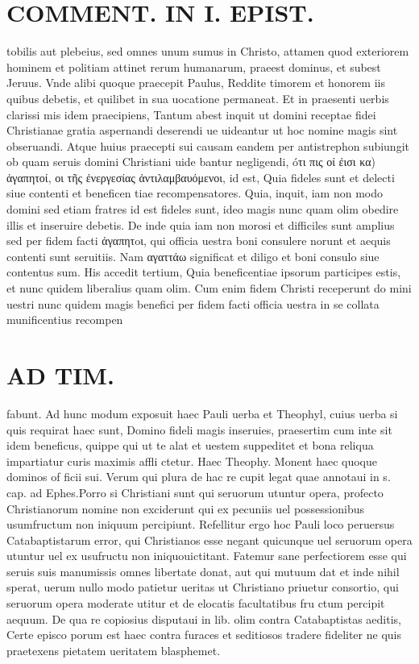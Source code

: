 \documentclass{article}
\begin{document}
\begin{pages}
\section*{COMMENT. IN I. EPIST. }\pstart tobilis aut plebeius, sed omnes unum sumus in Christo, attamen quod exteriorem hominem et politiam attinet rerum humanarum, praeest dominus, et subest Jeruus. Vnde alibi quoque praecepit Paulus, Reddite timorem et honorem iis quibus debetis, et quilibet in sua uocatione permaneat. Et in praesenti uerbis clarissi mis idem praecipiens, Tantum abest inquit ut domini receptae fidei Christianae gratia aspernandi deserendi ue uideantur ut hoc nomine magis sint obseruandi. Atque huius praecepti sui causam eandem per antistrephon subiungit ob quam seruis domini Christiani uide bantur negligendi, óτι πις οί ἐισι κα) ἀγαπητοί, οι τῆς ἐνεργεσίας ἀντιλαμβαυόμενοι, id est, Quia fideles sunt et delecti siue contenti et beneficen tiae recompensatores. Quia, inquit, iam non modo domini sed etiam fratres id est fideles sunt, ideo magis nunc quam olim obedire illis et inseruire debetis. De inde quia iam non morosi et difficiles sunt amplius sed per fidem facti ἀγαπητoι, qui officia uestra boni consulere norunt et aequis contenti sunt seruitiis. Nam αγαττάω significat et diligo et boni consulo siue contentus sum. His accedit tertium, Quia beneficentiae ipsorum participes estis, et nunc quidem liberalius quam olim. Cum enim fidem Christi receperunt do mini uestri nunc quidem magis benefici per fidem facti officia uestra in se collata munificentius recompen  \pend
\section*{AD TIM. }
\marginpar{[ p.164 ]}\pstart fabunt. Ad hunc modum exposuit haec Pauli uerba et Theophyl, cuius uerba si quis requirat haec sunt, Domino fideli magis inseruies, praesertim cum inte sit idem beneficus, quippe qui ut te alat et uestem suppeditet et bona reliqua impartiatur curis maximis affli ctetur. Haec Theophy. Monent haec quoque dominos of ficii sui. Verum qui plura de hac re cupit legat quae annotaui in s. cap. ad Ephes.Porro si Christiani sunt qui seruorum utuntur opera, profecto Christianorum nomine non exciderunt qui ex pecuniis uel possessionibus usumfructum non iniquum percipiunt. Refellitur ergo hoc Pauli loco peruersus Catabaptistarum error, qui Christianos esse negant quicunque uel seruorum opera utuntur uel ex usufructu non iniquouictitant. Fatemur sane perfectiorem esse qui seruis suis manumissis omnes libertate donat, aut qui mutuum dat et inde nihil sperat, uerum nullo modo patietur ueritas ut Christiano priuetur consortio, qui seruorum opera moderate utitur et de elocatis facultatibus fru ctum percipit aequum. De qua re copiosius disputaui in lib. olim contra Catabaptistas aeditis, Certe episco porum est haec contra furaces et seditiosos tradere fideliter ne quis praetexens pietatem ueritatem blasphemet.  \pend
{}
{}

\end{pages}
\end{document}
